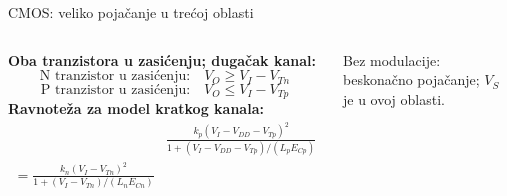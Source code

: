 \begin{frame}[label=09_2-s030]{CMOS: veliko pojačanje u trećoj oblasti}
\begin{columns}[T,onlytextwidth]\centering {}\textbf{Oba tranzistora u zasićenju; dugačak kanal:}\[\text{N tranzistor u zasićenju:}\quad V_O\ge V_I-V_{Tn}\]
\[\text{P tranzistor u zasićenju:}\quad V_O\le V_I-V_{Tp}\]
\textbf{Ravnoteža za model kratkog kanala:}\[\begin{aligned}&\frac{k_p(V_I-V_{DD}-V_{Tp})^2}{1+(V_I-V_{DD}-V_{Tp})/(L_pE_{Cp})}\\=\frac{k_n(V_I-V_{Tn})^2}{1+(V_I-V_{Tn})/(L_nE_{Cn})}\end{aligned}\]

Bez modulacije: beskonačno pojačanje; $V_S$ je u ovoj oblasti.\end{columns}
\end{frame}
